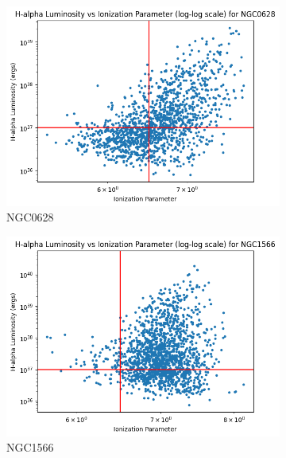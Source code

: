 \documentclass[12pt]{report}
\begin{document}
\begin{figure}[htbp]
    \centering

    \begin{subfigure}{0.3\textwidth}
        \centering
        \includegraphics[width=\linewidth]{image13.png}
        \caption{NGC0628}
        \label{fig:image13}
    \end{subfigure}
    \hfill
    \begin{subfigure}{0.3\textwidth}
        \centering
        \includegraphics[width=\linewidth]{image14.png}
        \caption{NGC1566}
        \label{fig:image14}
    \end{subfigure}
    \hfill
    \begin{subfigure}{0.3\textwidth}
        \centering

\end{subfigure}
\end{figure}
\end{document}
